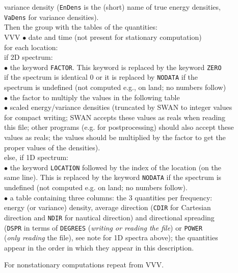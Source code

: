\documentclass[12pt]{book}
\begin{document}
\begin{tabbing}
                       variance density ({\tt EnDens} is the (short) name of true energy densities,\\
                       {\tt VaDens} for variance densities).\-\\
Then                \> the group with the tables of the quantities:\\
VVV                 \> {$\bullet$} date and time (not present for stationary computation)\+\\
                       for each location:\+\\
                       if 2D spectrum:\\
                       {$\bullet$} the keyword {\tt FACTOR}. This keyword is replaced by the keyword {\tt ZERO}\\
                       if the spectrum is identical 0 or it is replaced by {\tt NODATA} if the\\
                       spectrum is undefined (not computed e.g., on land; no numbers follow)\\
                       {$\bullet$} the factor to multiply the values in the following table\\
                       {$\bullet$} scaled energy/variance densities (truncated by SWAN to integer values\\
                       for compact writing; SWAN accepts these values as reals when reading\\
                       this file; other programs (e.g. for postprocessing) should also accept these\\
                       values as reals; the values should be multiplied by the factor to get the\\
                       proper values of the densities).\\
                       else, if 1D spectrum:\\
                       {$\bullet$} the keyword {\tt LOCATION} followed by the index of the location (on the\\
                       same line). This is replaced by the keyword {\tt NODATA} if the spectrum is\\
                       undefined (not computed e.g. on land; no numbers follow).\\
                       {$\bullet$} a table containing three columns: the 3 quantities per frequency:\\
                       energy (or variance) density, average direction ({\tt CDIR} for Cartesian\\
                       direction and {\tt NDIR} for nautical direction) and directional spreading\\
                       ({\tt DSPR} in terms of {\tt DEGREES} ({\it writing or reading the file}) or {\tt POWER}\\
                       ({\it only reading} the file), see note for 1D spectra above); the quantities\\
                       appear in the order in which they appear in this description.\-\\
\end{tabbing}
For nonstationary computations repeat from VVV.
\end{document}
